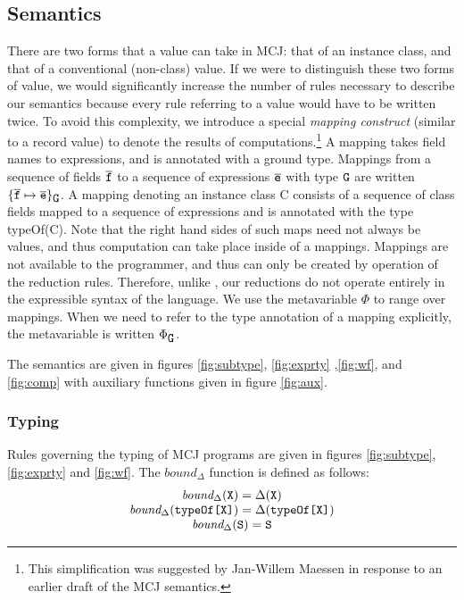\documentclass{acm-sigplan}
\begin{document}
\subsection{Semantics}
\label{formalsem}

There are two forms that a value can take in MCJ: that of an instance
class, and that of a conventional (non-class) value. If we were to
distinguish these two forms of value, we would significantly increase
the number of rules necessary to describe our semantics because every
rule referring to a value would have to be written twice. To avoid
this complexity, we introduce a special {\em mapping construct}
(similar to a record value) to denote the results of
computations.\footnote{This simplification was suggested by Jan-Willem
Maessen in response to an earlier draft of the MCJ semantics.}  A
mapping takes field names to expressions, and is annotated with a
ground type. Mappings from a sequence of fields ${\overline{{\mbox {\tt f}}}}$ to a sequence of
expressions ${\overline{{\mbox {\tt e}}}}$ with type $\mbox {\tt G}$ are written $\{{{\overline{{\mbox {\tt f}}}}} \mapsto {\ensuremath {{\overline{{\mbox {\tt e}}}}}}\}_{\mbox {\tt G}}$.
A mapping denoting an instance class {\txt C} consists of a sequence
of class fields mapped to a sequence of expressions and is annotated
with the type {\txt typeOf(C)}. Note that the right hand sides of such
maps need not always be values, and thus computation can take place
inside of a mappings.  Mappings are not available to the programmer,
and thus can only be created by operation of the reduction rules.
Therefore, unlike \FJ, our reductions do not operate entirely in the
expressible syntax of the language.  We use the metavariable $\Phi$ to
range over mappings.  When we need to refer to the type annotation of
a mapping explicitly, the metavariable is written $\Phi_{\mbox {\tt G}}$.

The
semantics are given in figures \ref{fig:subtype}, \ref{fig:exprty}
,\ref{fig:wf}, and \ref{fig:comp} with auxiliary functions given in
figure \ref{fig:aux}.


\subsubsection{Typing}
Rules governing the typing of MCJ programs are given in figures
\ref{fig:subtype}, \ref{fig:exprty} and \ref{fig:wf}.  The
$bound_{\Delta}$ function is defined as follows:
\begin{displaymath}
\begin{array}{c}
\mbox{\it bound}_{\Delta}(\mbox {\tt X}) = \Delta(\mbox {\tt X}) \\
\mbox{\it bound}_{\Delta}({{\mbox {\tt typeOf\mbox{\tt [}\ensuremath{\mbox {\tt X}}\mbox{\tt ]}}}}) = \Delta({{\mbox {\tt typeOf\mbox{\tt [}\ensuremath{\mbox {\tt X}}\mbox{\tt ]}}}}) \\
\mbox{\it bound}_{\Delta}(\mbox {\tt S}) = \mbox {\tt S}
\end{array}
\end{displaymath}
\end{document}
